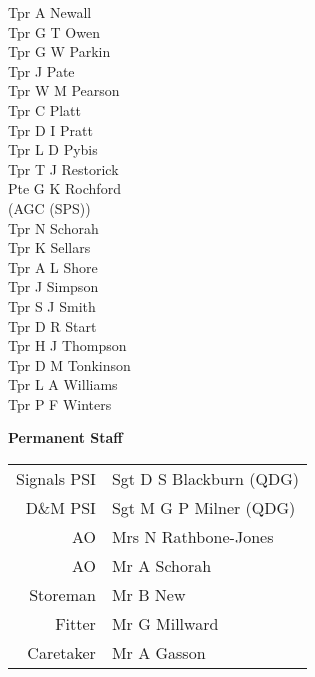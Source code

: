 \begin{multicols}{4}
  Tpr A Newall \\
  Tpr G T Owen \\
  Tpr G W Parkin \\
  Tpr J Pate \\
  Tpr W M Pearson \\
  Tpr C Platt \\
  Tpr D I Pratt \\
  Tpr L D Pybis \\
  Tpr T J Restorick \\
  Pte G K Rochford \\ \indent (AGC (SPS)) \\
  Tpr N Schorah \\
  Tpr K Sellars \\
  Tpr A L Shore \\
  Tpr J Simpson \\
  Tpr S J Smith \\
  Tpr D R Start \\
  Tpr H J Thompson \\
  Tpr D M Tonkinson \\
  Tpr L A Williams \\
  Tpr P F Winters \\
\end{multicols}

\begin{center}
  \Large
  \textbf{Permanent Staff}
\end{center}

\begin{center}
  \small
  \begin{tabular}{rl}
    Signals PSI & Sgt D S Blackburn (QDG) \\
    D\&M PSI & Sgt M G P Milner (QDG) \\
    AO & Mrs N Rathbone-Jones \\
    AO & Mr A Schorah \\
    Storeman & Mr B New \\
    Fitter & Mr G Millward \\
    Caretaker & Mr A Gasson \\
  \end{tabular}
\end{center}
